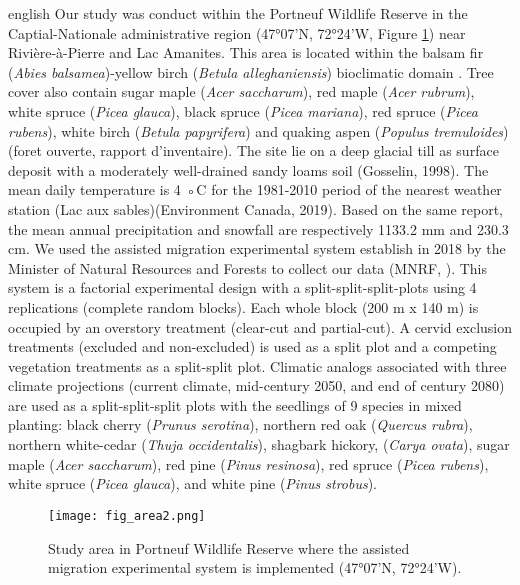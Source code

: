 \begin{otherlanguage*}{english}
  Our study was conduct within the Portneuf Wildlife Reserve in the Captial-Nationale administrative region (47°07'N, 72°24'W, Figure \ref{fig:area}) near Rivière-à-Pierre and Lac Amanites. 
  This area is located within the balsam fir (\textit{Abies balsamea})-yellow birch (\textit{Betula alleghaniensis}) bioclimatic domain \citep{saucierChapitreEcologieForestiere2009}.
  Tree cover also contain sugar maple (\textit{Acer saccharum}), red maple (\textit{Acer rubrum}), white spruce (\textit{Picea glauca}), black spruce (\textit{Picea mariana}), red spruce (\textit{Picea rubens}),
  white birch (\textit{Betula papyrifera}) and quaking aspen (\textit{Populus tremuloides}) (foret ouverte, rapport d'inventaire). 
  The site lie on a deep glacial till as surface deposit with a moderately well-drained sandy loams soil (Gosselin, 1998).
  The mean daily temperature is 4 ◦C for the 1981-2010 period of the nearest weather station (Lac aux sables)(Environment Canada, 2019). 
  Based on the same report, the mean annual precipitation and snowfall are respectively 1133.2 mm and 230.3 cm.
  We used the assisted migration experimental system establish in 2018 by the Minister of Natural Resources and Forests to collect our data (MNRF, \citealp{royoDesiredREgenerationAssisted2023}).
  This system is a factorial experimental design with a split-split-split-plots using 4 replications (complete random blocks). 
  Each whole block (200 m x 140 m) is occupied by an overstory treatment (clear-cut and partial-cut). 
  A cervid exclusion treatments (excluded and non-excluded) is used as a split plot and a competing vegetation treatments as a split-split plot. 
  Climatic analogs associated with three climate projections (current climate, mid-century 2050, and end of century 2080) 
  are used as a split-split-split plots with the seedlings of 9 species in mixed planting: black cherry (\textit{Prunus serotina}), northern red oak (\textit{Quercus rubra}), 
  northern white-cedar (\textit{Thuja occidentalis}), shagbark hickory, (\textit{Carya ovata}), sugar maple (\textit{Acer saccharum}), red pine (\textit{Pinus resinosa}), 
  red spruce (\textit{Picea rubens}), white spruce (\textit{Picea glauca}), and white pine (\textit{Pinus strobus}).

\end{otherlanguage*}

\begin{figure}[ht!]
	\centering
	\texttt{[image: fig\_area2.png]}
	\caption[Study area in Portneuf Wildlife Reserve, Québec, Canada.]{Study area in Portneuf Wildlife Reserve where the assisted migration experimental system is implemented (47°07'N, 72°24'W).}
	\label{fig:area}
	\end{figure}  



